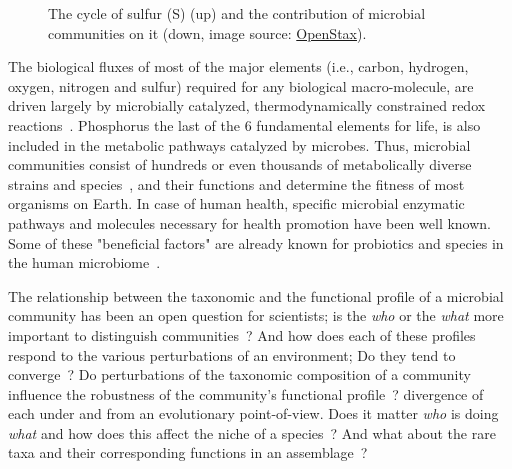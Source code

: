 \begin{figure}[!h]
         \caption[The cycle of S and the role of microbial communities]{
            The cycle of sulfur (S) (up) and the contribution of microbial communities on it (down, image source: \href{https://openstax.org/resources/3002d0fba25221d24455917117482a079a11f321}{OpenStax}).
         }
         \label{fig:co2}
      \end{figure}

      The biological fluxes of most of the major elements (i.e., carbon, hydrogen, oxygen, nitrogen and sulfur) required
      for any biological macro-molecule,
      are driven largely
      by microbially catalyzed, thermodynamically constrained redox reactions~\citep{falkowski2008microbial}. 
      Phosphorus the last of the 6 fundamental elements for life, is also included in the metabolic pathways catalyzed by microbes. 
      Thus, microbial communities consist of hundreds or even thousands of metabolically diverse strains and species~\citep{leventhal2018strain},
      and their functions
      and determine the fitness of most organisms on Earth. 
      In case of human health, specific microbial enzymatic pathways and molecules necessary for health promotion have been well known.
      Some of these "beneficial factors" are already known for probiotics and species in the human microbiome~\citep{marco2021defining}.

      The relationship between the taxonomic and the functional profile of a microbial community
      has been an open question for scientists; is the \textit{who} or the \textit{what} more important
      to distinguish communities~\citep{xu2014more}?
      And how does each of these profiles respond to the various perturbations of an environment; 
      Do they tend to converge~\citep{estrela2022functional}?
      Do perturbations of the taxonomic composition of a community influence the robustness of the community’s functional profile~\citep{eng2018taxa}?
      divergence of each under  
      and from an evolutionary point-of-view. 
      Does it matter \textit{who} is doing \textit{what} and how does this affect 
      the niche of a species~\citep{louca2018function}?  
      And what about the rare taxa and their corresponding functions in an assemblage~\citep{chen2020rare, jousset2017less}?

